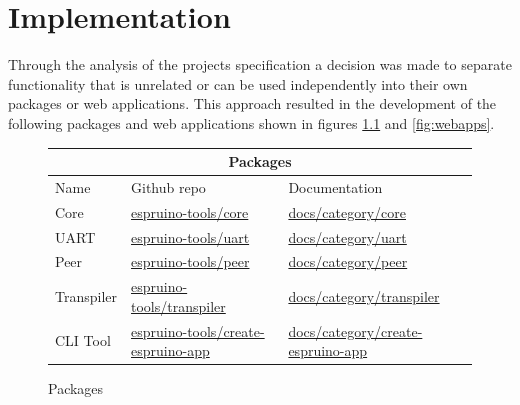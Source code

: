 \documentclass{l4proj}
\begin{document}
\chapter{Implementation}

\text Through the analysis of the projects specification a decision was made to separate functionality that is unrelated or can be used independently into their own packages or web applications. This approach resulted in the development of the following packages and web applications shown in figures \ref{fig:packages} and \ref{fig:webapps}.

\begin{figure}[!ht]
    
\begin{center}
\begin{tabular}{|p{2.5cm}|p{5.5cm}|p{5.5cm}|}
 \hline
 \multicolumn{3}{|c|}{Packages} \\
 \hline
 Name  & Github repo& Documentation\\
 \hline
Core & \href{https://github.com/espruino-tools/core}{espruino-tools/core}  & \href{https://documentation-xi-liard.vercel.app/docs/category/core}{docs/category/core}  \\

UART & \href{https://github.com/espruino-tools/uart}{espruino-tools/uart}  & \href{https://documentation-xi-liard.vercel.app/docs/category/uart}{docs/category/uart}  \\

Peer & \href{https://github.com/espruino-tools/peer}{espruino-tools/peer}  & \href{https://documentation-xi-liard.vercel.app/docs/category/peer}{docs/category/peer}  \\

Transpiler & \href{https://github.com/espruino-tools/transpiler}{espruino-tools/transpiler}  & \href{https://documentation-xi-liard.vercel.app/docs/category/transpiler}{docs/category/transpiler}  \\

CLI Tool &  \href{https://github.com/espruino-tools/create-espruino-app}{espruino-tools/create-espruino-app}  & \href{https://documentation-xi-liard.vercel.app/docs/category/create-espruino-app}{docs/category/create-espruino-app}  \\
 \hline
\end{tabular}
\end{center} 
    \caption{Packages}
    \label{fig:packages}
\end{figure}
\end{document}
